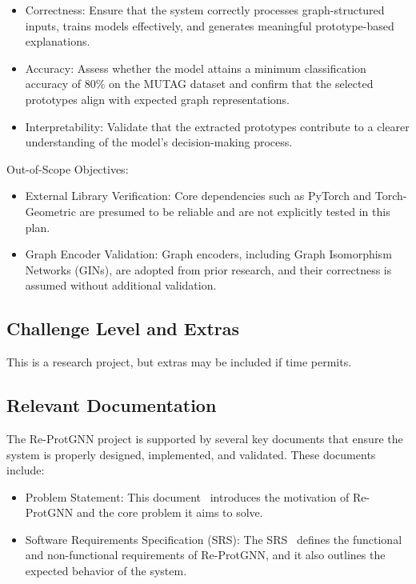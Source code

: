 \documentclass[12pt, titlepage]{article}
\begin{document}
\begin{itemize}
    \item Correctness: Ensure that the system correctly processes graph-structured inputs, trains models effectively, and generates meaningful prototype-based explanations.
    \item Accuracy: Assess whether the model attains a minimum classification accuracy of 80\% on the MUTAG dataset and confirm that the selected prototypes align with expected graph representations.
    \item Interpretability: Validate that the extracted prototypes contribute to a clearer understanding of the model’s decision-making process.
\end{itemize}

Out-of-Scope Objectives:
\begin{itemize}
    \item External Library Verification: Core dependencies such as PyTorch and Torch-Geometric are presumed to be reliable and are not explicitly tested in this plan.
    \item Graph Encoder Validation: Graph encoders, including Graph Isomorphism Networks (GINs), are adopted from prior research, and their correctness is assumed without additional validation.
\end{itemize}

\subsection{Challenge Level and Extras}
This is a research project, but extras may be included if time permits.

\subsection{Relevant Documentation}

The Re-ProtGNN project is supported by several key documents that ensure the system is properly designed, implemented, and validated. These documents include:

\begin{itemize}
    \item Problem Statement: This document~\cite{yuanqi2025protgnn} introduces the motivation of Re-ProtGNN and the core problem it aims to solve.
    
    \item Software Requirements Specification (SRS): The SRS~\cite{Yuanqi_ReProtGNN_SRS} defines the functional and non-functional requirements of Re-ProtGNN, and it also outlines the expected behavior of the system.
\end{itemize}
\end{document}
